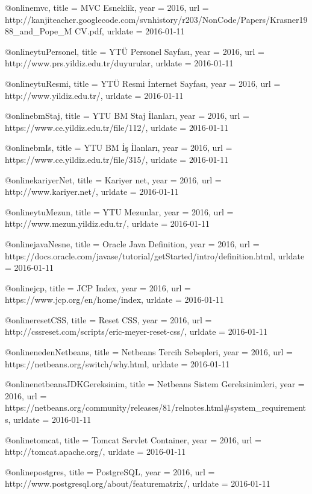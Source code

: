 @online{mvc,
    title = {MVC Esneklik},
    year = 2016,
    url = {http://kanjiteacher.googlecode.com/svnhistory/r203/NonCode/Papers/Krasner1988_and_Pope_M
CV.pdf},
    urldate = {2016-01-11}
}

@online{ytuPersonel,
    title = {YTÜ Personel Sayfası},
    year = 2016,
    url = {http://www.prs.yildiz.edu.tr/duyurular},
    urldate = {2016-01-11}
}

@online{ytuResmi,
    title = {YTÜ Resmi İnternet Sayfası},
    year = 2016,
    url = {http://www.yildiz.edu.tr/},
    urldate = {2016-01-11}
}

@online{bmStaj,
    title = {YTU BM Staj İlanları},
    year = 2016,
    url = {https://www.ce.yildiz.edu.tr/file/112/},
    urldate = {2016-01-11}
}

@online{bmIs,
    title = {YTU BM İş İlanları},
    year = 2016,
    url = {https://www.ce.yildiz.edu.tr/file/315/},
    urldate = {2016-01-11}
}

@online{kariyerNet,
    title = {Kariyer net},
    year = 2016,
    url = {http://www.kariyer.net/},
    urldate = {2016-01-11}
}

@online{ytuMezun,
    title = {YTU Mezunlar},
    year = 2016,
    url = {http://www.mezun.yildiz.edu.tr/},
    urldate = {2016-01-11}
}

@online{javaNesne,
    title = {Oracle Java Definition},
    year = 2016,
    url = {https://docs.oracle.com/javase/tutorial/getStarted/intro/definition.html},
    urldate = {2016-01-11}
}

@online{jcp,
    title = {JCP Index},
    year = 2016,
    url = {https://www.jcp.org/en/home/index},
    urldate = {2016-01-11}
}

@online{resetCSS,
    title = {Reset CSS},
    year = 2016,
    url = {http://cssreset.com/scripts/eric-meyer-reset-css/},
    urldate = {2016-01-11}
}

@online{nedenNetbeans,
    title = {Netbeans Tercih Sebepleri},
    year = 2016,
    url = {https://netbeans.org/switch/why.html},
    urldate = {2016-01-11}
}

@online{netbeansJDKGereksinim,
    title = {Netbeans Sistem Gereksinimleri},
    year = 2016,
    url = {https://netbeans.org/community/releases/81/relnotes.html#system_requirements},
    urldate = {2016-01-11}
}

@online{tomcat,
    title = {Tomcat Servlet Container},
    year = 2016,
    url = {http://tomcat.apache.org/},
    urldate = {2016-01-11}
}

@online{postgres,
    title = {PostgreSQL},
    year = 2016,
    url = {http://www.postgresql.org/about/featurematrix/},
    urldate = {2016-01-11}
}


